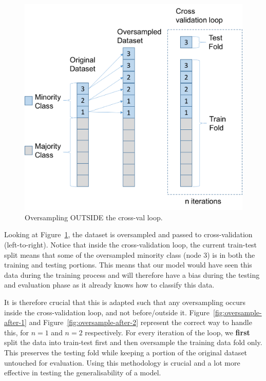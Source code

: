\documentclass[12pt,a4paper,twoside]{report}
\begin{document}
\begin{figure}[H]
\centering
\includegraphics[scale=0.8]{oversample-before}
\caption{Oversampling OUTSIDE the cross-val loop.}
\label{fig:oversample-before}
\end{figure}

Looking at Figure~\ref{fig:oversample-before}, the dataset is oversampled and passed to cross-validation (left-to-right). Notice that inside the cross-validation loop, the current train-test split means that some of the oversampled minority class (node 3) is in both the training and testing portions. This means that our model would have seen this data during the training process and will therefore have a bias during the testing and evaluation phase as it already knows how to classify this data. 

It is therefore crucial that this is adapted such that any oversampling occurs inside the cross-validation loop, and not before/outside it. Figure~\ref{fig:oversample-after-1} and Figure~\ref{fig:oversample-after-2} represent the correct way to handle this, for $n=1$ and $n=2$ respectively. For every iteration of the loop, we \textbf{first} split the data into train-test first and then oversample the training data fold only. This preserves the testing fold while keeping a portion of the original dataset untouched for evaluation. Using this methodology is crucial and a lot more effective in testing the generalisability of a model.
\end{document}
